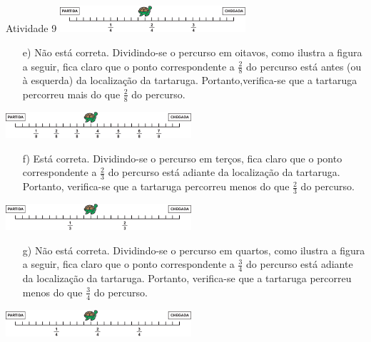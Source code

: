 \begin{multicols}{2}
\begin{resposta*}{Atividade 9}
 \includegraphics[width=195pt, keepaspectratio]{..//media/cap3/secoes/png/ativ9_resp_d}

\begin{enumerate} [\quad a)] %
  \item[e)]     Não está correta. Dividindo-se o percurso em oitavos, como ilustra a figura a seguir, fica claro que o ponto correspondente a     $\frac{2}{8}$     do percurso está antes (ou à esquerda) da localização da tartaruga. Portanto,verifica-se que a tartaruga percorreu mais do que     $\frac{2}{8}$     do percurso.          
\end{enumerate}

 \includegraphics[width=195pt, keepaspectratio]{..//media/cap3/secoes/png/ativ9_resp_e}

\begin{enumerate} [\quad a)] %

  \item[f)]     Está correta. Dividindo-se o percurso em terços, fica claro que o ponto correspondente a     $\frac{2}{3}$     do percurso está adiante da localização da tartaruga. Portanto, verifica-se que a tartaruga percorreu menos do que     $\frac{2}{3}$     do percurso.          
\end{enumerate}

 \includegraphics[width=195pt, keepaspectratio]{..//media/cap3/secoes/png/ativ9_resp_f}

\begin{enumerate} [\quad a)] %

  \item[g)]     Não está correta. Dividindo-se o percurso em quartos, como ilustra a figura a seguir, fica claro que o ponto correspondente a     $\frac{3}{4}$     do percurso está adiante da localização da tartaruga. Portanto, verifica-se que a tartaruga percorreu menos do que     $\frac{3}{4}$     do percurso.          
\end{enumerate}

 \includegraphics[width=195pt, keepaspectratio]{..//media/cap3/secoes/png/ativ9_resp_g}


\end{resposta*}
\end{multicols}
